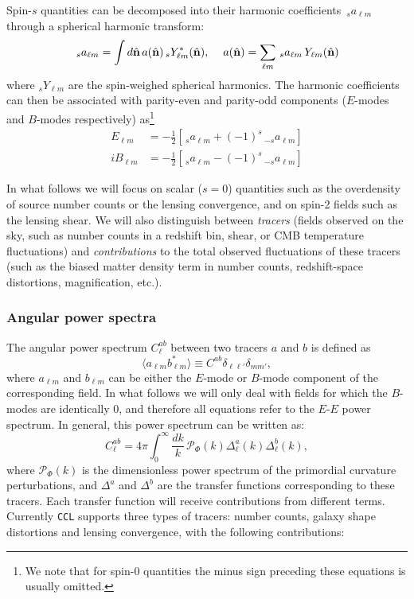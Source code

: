 \documentclass[\docopts]{\docclass}
\newcommand{\nv}{\hat{\bf n}}
\newcommand{\ccl}{{\tt CCL}\xspace}
\begin{document}
Spin-$s$ quantities can be decomposed into their harmonic coefficients $\,_sa_{\ell m}$ through a spherical harmonic transform:
\begin{equation}\nonumber
  \,_sa_{\ell m}=\int d\nv\,a(\nv)\,_sY^*_{\ell m}(\nv),\hspace{12pt}
  a(\nv)=\sum_{\ell m}\,_sa_{\ell m}\,Y_{\ell m}(\nv)
\end{equation}
where $_sY_{\ell m}$ are the spin-weighed spherical harmonics. The harmonic coefficients can then be associated with parity-even and parity-odd components ($E$-modes and $B$-modes respectively) as\footnote{We note that for spin-$0$ quantities the minus sign preceding these equations is usually omitted.}
\begin{align}\nonumber
   E_{\ell m}&=-\frac{1}{2}\left[\,_{s}a_{\ell m}+(-1)^s\,_{-s}a_{\ell m}\right]\\\nonumber
  iB_{\ell m}&=-\frac{1}{2}\left[\,_{s}a_{\ell m}-(-1)^s\,_{-s}a_{\ell m}\right]
\end{align}

In what follows we will focus on scalar ($s=0$) quantities such as the overdensity of source number counts or the lensing convergence, and on spin-2 fields such as the lensing shear. We will also distinguish between {\sl tracers} (fields observed on the sky, such as number counts in a redshift bin, shear, or CMB temperature fluctuations) and {\sl contributions} to the total observed fluctuations of these tracers (such as the biased matter density term in number counts, redshift-space distortions, magnification, etc.).

\subsubsection{Angular power spectra}\label{sssec:2pt.pspec}

The angular power spectrum $C^{ab}_\ell$ between two tracers $a$ and $b$ is defined as
\begin{equation}
  \langle a_{\ell m}b^*_{\ell m}\rangle\equiv C^{ab}\delta_{\ell\ell'}\delta_{mm'},
\end{equation}
where $a_{\ell m}$ and $b_{\ell m}$ can be either the $E$-mode or $B$-mode component of the corresponding field. In what follows we will only deal with fields for which the $B$-modes are identically $0$, and therefore all equations refer to the $E$-$E$ power spectrum. In general, this power spectrum can be written as:
\begin{equation}
  C^{ab}_\ell=4\pi\int_0^\infty \frac{dk}{k}\,\mathcal{P}_\Phi(k)\Delta^a_\ell(k)\Delta^b_\ell(k),
  \label{eq:cls}
\end{equation}
where $\mathcal{P}_\Phi(k)$ is the dimensionless power spectrum of the primordial curvature perturbations, and $\Delta^a$ and $\Delta^b$ are the transfer functions corresponding to these tracers. Each transfer function will receive contributions from different terms. Currently \ccl supports three types of tracers: number counts, galaxy shape distortions and lensing convergence, with the following contributions:
\end{document}
